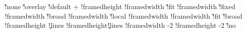 {{        \ifinheritruledlinewidth\linewidth{}\fi}%
   \else
     \zeropoint
   \fi
   \ifx\localformat\empty
     \boxhasformatfalse
   \else
     \boxhasformattrue
     \dosetraggedcommand\localformat
     \edef\dobeforeframedbox{\raggedtopcommand\framedparameter\c!top}%
     \edef\doafterframedbox {\framedparameter\c!bottom\raggedbottomcommand}%
   \fi
   \ifx\localoffset\v!none
     \boxhasoffsetfalse
     \boxhasstrutfalse
     \boxisoverlaidfalse
     \@@localoffset{}
   \else\ifx\localoffset\v!overlay
     \boxhasoffsetfalse
     \boxhasstrutfalse
     \boxisoverlaidtrue
     \@@localoffset\zeropoint
   \else
     \boxhasoffsettrue
     \boxhasstruttrue
     \boxisoverlaidfalse
     \ifx\localoffset\v!default %
       \let\localoffset\defaultframeoffset
     \else
       \let{}\localoffset
     \fi
     \@@localoffset\dimexpr\localoffset+\relax
   \fi\fi
   \!!framedheight\zeropoint
   \!!framedwidth \zeropoint
   \ifx\localwidth\v!fit
     \ifboxhasformat
       \boxhaswidthtrue
       \!!framedwidth\hsize
     \else
       \boxhaswidthfalse
     \fi
   \else\ifx\localwidth\v!fixed %
     \ifboxhasformat
       \boxhaswidthtrue
       \!!framedwidth\hsize
     \else
       \boxhaswidthfalse
     \fi
   \else\ifx\localwidth\v!broad
     \boxhaswidthtrue
     \!!framedwidth\hsize
   \else\ifx\localwidth\v!local
     \boxhaswidthtrue
     \setlocalhsize
     \!!framedwidth\localhsize
   \else
     \boxhaswidthtrue
     \!!framedwidth\localwidth
   \fi\fi\fi\fi
   \ifx\localheight\v!fit
     \boxhasheightfalse %
   \else\ifx\localheight\v!broad
     \boxhasheightfalse
   \else
     \boxhasheighttrue
     \!!framedheight\localheight
   \fi\fi
   \ifboxhasheight
   \else
       {\ifcase\framedparameter\c!lines\else
          \!!framedheight\framedparameter\c!lines\lineheight
          \edef\localheight{\the\!!framedheight}%
          \boxhasheighttrue
        \fi}%
   \fi
   \advance\!!framedwidth  -2\@@localoffset
   \advance\!!framedheight -2\@@localoffset
   \ifx\localstrut\v!no
}
